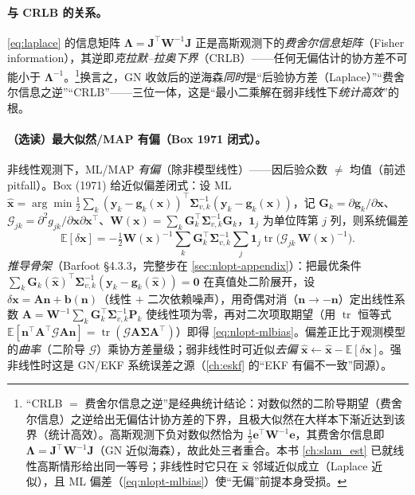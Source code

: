 \paragraph{与 CRLB 的关系。}
\cref{eq:laplace} 的信息矩阵 $\boldsymbol{\Lambda}=\mathbf{J}^\top\mathbf{W}^{-1}\mathbf{J}$ 正是高斯观测下的\emph{费舍尔信息矩阵}（Fisher information），其逆即\emph{克拉默--拉奥下界}（CRLB）——任何无偏估计的协方差不可能小于 $\boldsymbol{\Lambda}^{-1}$。\footnote{“CRLB $=$ 费舍尔信息之逆”是经典统计结论：对数似然的二阶导期望（费舍尔信息）之逆给出无偏估计协方差的下界，且极大似然在大样本下渐近达到该界（统计高效）。高斯观测下负对数似然恰为 $\tfrac12\mathbf{e}^\top\mathbf{W}^{-1}\mathbf{e}$，其费舍尔信息即 $\boldsymbol{\Lambda}=\mathbf{J}^\top\mathbf{W}^{-1}\mathbf{J}$（GN 近似海森），故此处三者重合。本书 \cref{ch:slam_est} 已就线性高斯情形给出同一等号；非线性时它只在 $\hat{\mathbf{x}}$ 邻域近似成立（Laplace 近似），且 ML 偏差（\cref{eq:nlopt-mlbias}）使“无偏”前提本身受损。}换言之，GN 收敛后的逆海森\emph{同时}是“后验协方差（Laplace）”“费舍尔信息之逆”“CRLB”——三位一体，这是“最小二乘解在弱非线性下\emph{统计高效}”的根。

\paragraph{（选读）最大似然/MAP 有偏（Box 1971 闭式）。}\cite{barfoot2024state}
非线性观测下，ML/MAP \emph{有偏}（除非模型线性）——因后验众数 $\neq$ 均值（前述 pitfall）。Box (1971) 给近似偏差闭式：设 ML $\hat{\mathbf{x}}=\arg\min\tfrac12\sum_k(\mathbf{y}_k-\mathbf{g}_k(\mathbf{x}))^\top\boldsymbol{\Sigma}_{v,k}^{-1}(\mathbf{y}_k-\mathbf{g}_k(\mathbf{x}))$，记 $\mathbf{G}_k=\partial\mathbf{g}_k/\partial\mathbf{x}$、$\boldsymbol{\mathcal{G}}_{jk}=\partial^2 g_{jk}/\partial\mathbf{x}\partial\mathbf{x}^\top$、$\mathbf{W}(\mathbf{x})=\sum_k\mathbf{G}_k^\top\boldsymbol{\Sigma}_{v,k}^{-1}\mathbf{G}_k$，$\mathbf{1}_j$ 为单位阵第 $j$ 列，则系统偏差
\begin{equation}
  \mathbb{E}[\delta\mathbf{x}]=-\tfrac12\mathbf{W}(\mathbf{x})^{-1}\sum_k\mathbf{G}_k^\top\boldsymbol{\Sigma}_{v,k}^{-1}\sum_j\mathbf{1}_j\operatorname{tr}\!\big(\boldsymbol{\mathcal{G}}_{jk}\,\mathbf{W}(\mathbf{x})^{-1}\big).
  \label{eq:nlopt-mlbias}
\end{equation}
\emph{推导骨架}（Barfoot\cite{barfoot2024state} §4.3.3，完整步在 \cref{sec:nlopt-appendix}）：把最优条件 $\sum_k\mathbf{G}_k(\hat{\mathbf{x}})^\top\boldsymbol{\Sigma}_{v,k}^{-1}(\mathbf{y}_k-\mathbf{g}_k(\hat{\mathbf{x}}))=\mathbf{0}$ 在真值处二阶展开，设 $\delta\mathbf{x}=\mathbf{A}\mathbf{n}+\mathbf{b}(\mathbf{n})$（线性 $+$ 二次依赖噪声），用奇偶对消（$\mathbf{n}\to-\mathbf{n}$）定出线性系数 $\mathbf{A}=\mathbf{W}^{-1}\sum_k\mathbf{G}_k^\top\boldsymbol{\Sigma}_{v,k}^{-1}\mathbf{P}_k$ 使线性项为零，再对二次项取期望（用 $\operatorname{tr}$ 恒等式 $\mathbb{E}[\mathbf{n}^\top\mathbf{A}^\top\boldsymbol{\mathcal{G}}\mathbf{A}\mathbf{n}]=\operatorname{tr}(\boldsymbol{\mathcal{G}}\mathbf{A}\boldsymbol{\Sigma}\mathbf{A}^\top)$）即得 \cref{eq:nlopt-mlbias}。偏差正比于观测模型的\emph{曲率}（二阶导 $\boldsymbol{\mathcal{G}}$）乘协方差量级；弱非线性时可近似\emph{去偏} $\hat{\mathbf{x}}\leftarrow\hat{\mathbf{x}}-\mathbb{E}[\delta\mathbf{x}]$。强非线性时这是 GN/EKF 系统误差之源（\cref{ch:eskf} 的“EKF 有偏不一致”同源）。

